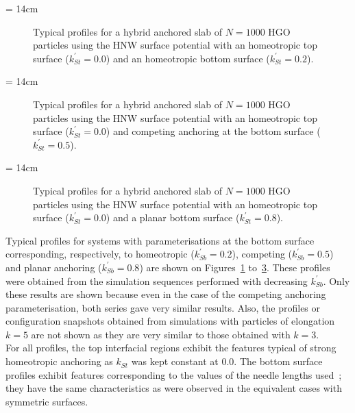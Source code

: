 \picW = 14cm
\begin{figure}
	\centering
	\caption{Typical profiles for a hybrid anchored slab of $N=1000$ HGO particles using the
	HNW surface potential with an homeotropic top surface
	($k^\prime_{St}=0.0$) and an homeotropic bottom surface ($k^\prime_{St}=0.2$).}
	\label{fig:HGO_Hconf_typeProfHomeo}
\end{figure}


\picW = 14cm
\begin{figure}
	\centering
	\caption{Typical profiles for a hybrid anchored slab of $N=1000$ HGO particles using the
	HNW surface potential with an homeotropic top surface ($k^\prime_{St}=0.0$)
	and competing anchoring at the bottom surface ($k^\prime_{St}=0.5$).}
	\label{fig:HGO_Hconf_typeProfBist}
\end{figure}


\picW = 14cm
\begin{figure}
	\centering
	\caption{Typical profiles for a hybrid anchored slab of $N=1000$ HGO particles using the
	HNW surface potential with an homeotropic top surface ($k^\prime_{St}=0.0$) and a
	planar bottom surface ($k^\prime_{St}=0.8$).}
	\label{fig:HGO_Hconf_typeProfPlanar}
\end{figure}

Typical profiles for systems with parameterisations at the bottom surface
corresponding, respectively, to homeotropic ($k^\prime_{Sb} = 0.2$), competing ($k^\prime_{Sb} =
0.5$) and planar anchoring ($k^\prime_{Sb} = 0.8$) are shown on
Figures~\ref{fig:HGO_Hconf_typeProfHomeo} to~\ref{fig:HGO_Hconf_typeProfPlanar}. These profiles
were obtained from the simulation sequences performed with decreasing $k^\prime_{Sb}$. Only
these results are shown because even in the case of the competing anchoring parameterisation,
both series gave very similar results. Also, the profiles or configuration snapshots obtained
from simulations with particles of elongation $k=5$ are not shown as they are very similar to
those obtained with $k=3$.\\
For all profiles, the top interfacial regions exhibit the features
typical of strong homeotropic anchoring as $k_{St}$ was kept constant at $0.0$. The bottom
surface profiles exhibit features corresponding to the values of the needle lengths used~; they
have the same characteristics as were observed in the equivalent cases with symmetric
surfaces.\\

